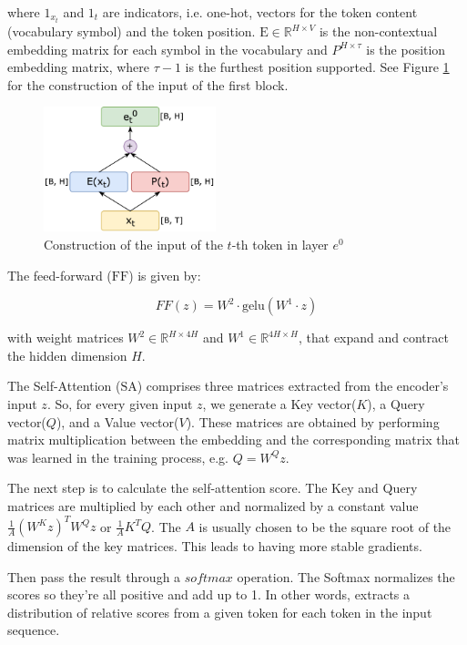 where $\mathrm{1}_{x_t}$ and $\mathrm{1}_t$ are indicators, i.e. one-hot, vectors for the token content (vocabulary symbol) and the token position. $\mathrm{E} \in \mathbb{R}^{H \times V}$ is the non-contextual embedding matrix for each symbol in the vocabulary and $P^{H \times \tau}$ is the position embedding matrix, where  $\tau-1$ is the furthest position supported. See Figure \ref{fig:e0} for the construction of the input of the first block. \\


\begin{figure}[h]
    \centering
    \includegraphics[width=5cm]{pages/imgs/e0.png}
    \caption{Construction of the input of the $t$-th token in layer $e^0$}
    \label{fig:e0}
\end{figure}



\noindent The feed-forward ($\mathrm{FF}$) is given by:

\begin{equation}
FF(z) = W^2\cdot \mathrm{gelu}(W^1 \cdot z)
\end{equation}

\noindent with weight matrices $W^2 \in \mathbb{R}^{H \times 4H}$ and $W^1 \in \mathbb{R}^{4H \times H}$, that expand and contract the hidden dimension $H$.

The Self-Attention ($\mathrm{SA}$) comprises three matrices extracted from the encoder’s input $z$. So, for every given input $z$, we generate a Key vector($K$), a Query vector($Q$), and a Value vector($V$). These matrices are obtained by performing matrix multiplication between the embedding and the corresponding matrix that was learned in the training process, e.g. $Q = W^Q z$.

The next step is to calculate the self-attention score. The Key and Query matrices are multiplied by each other and normalized by a constant value $\frac{1}{A} \left(W^K z\right)^T W^Q z$ or $\frac{1}{A} K^T Q$. The $A$ is usually chosen to be the square root of the dimension of the key matrices. This leads to having more stable gradients.

\noindent Then pass the result through a $softmax$ operation. The Softmax normalizes the scores so they’re all positive and add up to 1. In other words, extracts a distribution of relative scores from a given token for each token in the input sequence.

